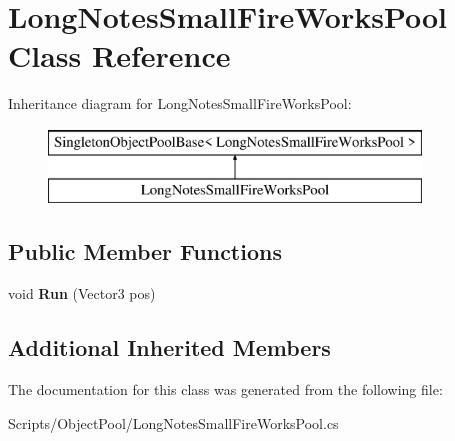\hypertarget{class_long_notes_small_fire_works_pool}{}\section{Long\+Notes\+Small\+Fire\+Works\+Pool Class Reference}
\label{class_long_notes_small_fire_works_pool}
Inheritance diagram for Long\+Notes\+Small\+Fire\+Works\+Pool\+:\begin{figure}[H]
\begin{center}
\leavevmode
\includegraphics[height=2.000000cm]{class_long_notes_small_fire_works_pool}
\end{center}
\end{figure}
\subsection*{Public Member Functions}
\begin{DoxyCompactItemize}
\item 
void {\bfseries Run} (Vector3 pos)\hypertarget{class_long_notes_small_fire_works_pool_a228be95120dd4ff58bcb0635d6af6651}{}\label{class_long_notes_small_fire_works_pool_a228be95120dd4ff58bcb0635d6af6651}

\end{DoxyCompactItemize}
\subsection*{Additional Inherited Members}


The documentation for this class was generated from the following file\+:\begin{DoxyCompactItemize}
\item 
Scripts/\+Object\+Pool/Long\+Notes\+Small\+Fire\+Works\+Pool.\+cs\end{DoxyCompactItemize}
